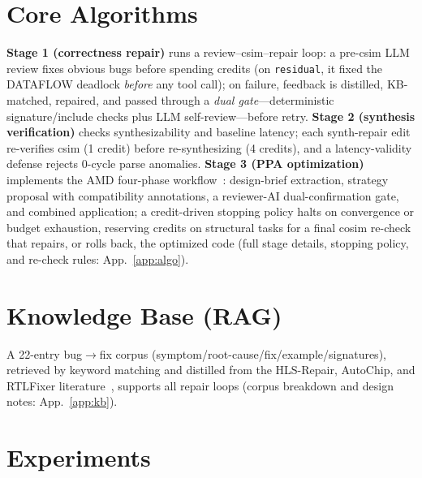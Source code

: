 \documentclass[10pt,conference,letterpaper]{IEEEtran}
\begin{document}
\section{Core Algorithms}
\label{sec:algo}

\textbf{Stage 1 (correctness repair)} runs a review--csim--repair loop: a pre-csim LLM review fixes obvious bugs before spending credits (on \texttt{residual}, it fixed the DATAFLOW deadlock \emph{before} any tool call); on failure, feedback is distilled, KB-matched, repaired, and passed through a \emph{dual gate}---deterministic signature/include checks plus LLM self-review---before retry. \textbf{Stage 2 (synthesis verification)} checks synthesizability and baseline latency; each synth-repair edit re-verifies csim (1 credit) before re-synthesizing (4 credits), and a latency-validity defense rejects 0-cycle parse anomalies. \textbf{Stage 3 (PPA optimization)} implements the AMD four-phase workflow~\cite{amdllm4hls}: design-brief extraction, strategy proposal with compatibility annotations, a reviewer-AI dual-confirmation gate, and combined application; a credit-driven stopping policy halts on convergence or budget exhaustion, reserving credits on structural tasks for a final cosim re-check that repairs, or rolls back, the optimized code (full stage details, stopping policy, and re-check rules: App.~\ref{app:algo}).

\section{Knowledge Base (RAG)}
\label{sec:kb}

A 22-entry bug$\to$fix corpus (symptom/root-cause/fix/example/signatures), retrieved by keyword matching and distilled from the HLS-Repair, AutoChip, and RTLFixer literature~\cite{hlsrepair,autochip,rtlfixer}, supports all repair loops (corpus breakdown and design notes: App.~\ref{app:kb}).

\section{Experiments}
\label{sec:results}
\end{document}
